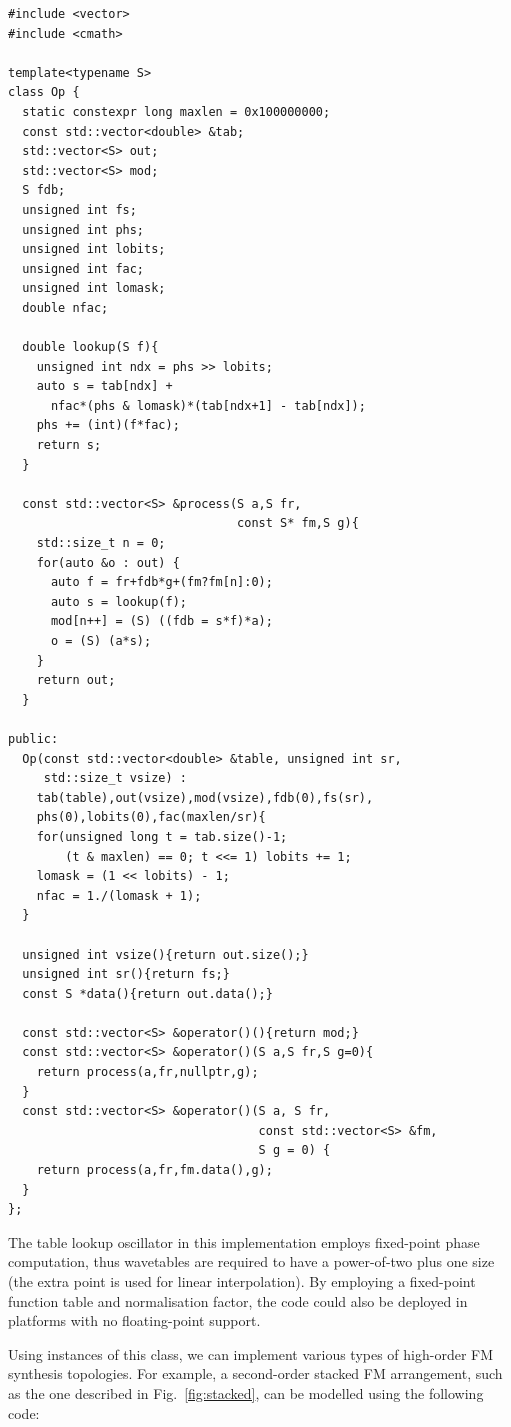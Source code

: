 \documentclass[]{interact}
\begin{document}
\begin{lstlisting}
#include <vector>
#include <cmath>

template<typename S>
class Op {
  static constexpr long maxlen = 0x100000000; 
  const std::vector<double> &tab;  
  std::vector<S> out;
  std::vector<S> mod;
  S fdb;
  unsigned int fs;  
  unsigned int phs;
  unsigned int lobits;
  unsigned int fac;
  unsigned int lomask;
  double nfac;
  
  double lookup(S f){
    unsigned int ndx = phs >> lobits; 
    auto s = tab[ndx] +
      nfac*(phs & lomask)*(tab[ndx+1] - tab[ndx]); 
    phs += (int)(f*fac); 
    return s;
  }

  const std::vector<S> &process(S a,S fr,
                                const S* fm,S g){
    std::size_t n = 0;
    for(auto &o : out) {
      auto f = fr+fdb*g+(fm?fm[n]:0);
      auto s = lookup(f);
      mod[n++] = (S) ((fdb = s*f)*a);
      o = (S) (a*s);
    }
    return out;
  }

public:
  Op(const std::vector<double> &table, unsigned int sr, 
     std::size_t vsize) :
    tab(table),out(vsize),mod(vsize),fdb(0),fs(sr),
    phs(0),lobits(0),fac(maxlen/sr){
    for(unsigned long t = tab.size()-1; 
        (t & maxlen) == 0; t <<= 1) lobits += 1;
    lomask = (1 << lobits) - 1;
    nfac = 1./(lomask + 1);
  }

  unsigned int vsize(){return out.size();}
  unsigned int sr(){return fs;}
  const S *data(){return out.data();}
  
  const std::vector<S> &operator()(){return mod;}
  const std::vector<S> &operator()(S a,S fr,S g=0){
    return process(a,fr,nullptr,g);
  }
  const std::vector<S> &operator()(S a, S fr,
                                   const std::vector<S> &fm,
                                   S g = 0) {
    return process(a,fr,fm.data(),g);
  }
};
\end{lstlisting}

\noindent The table lookup oscillator in this implementation employs fixed-point phase computation, thus wavetables
are required to have a power-of-two plus one size (the extra point is used for linear interpolation). By employing 
a fixed-point function table and normalisation factor, the code could also be deployed in platforms with no 
floating-point support. 

Using instances of this class, we can implement various types of high-order FM synthesis topologies. For example, a 
second-order stacked FM arrangement, such as the one described in Fig.~\ref{fig:stacked}, can be 
modelled using the following code:
\end{document}

